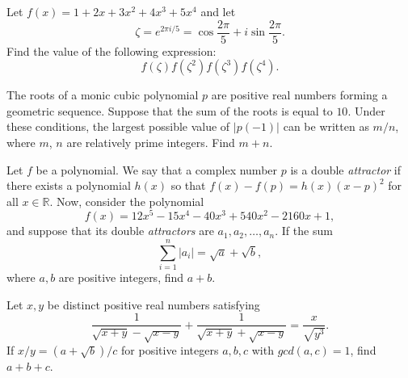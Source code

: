 \documentclass[11pt]{article}
\theoremstyle{definition}
\begin{document}
\begin{question}[name={2021 PUMaC, Algebra, \href{https://artofproblemsolving.com/community/c4p25094239}{Problem A3/B5}}]
	Let $f(x) = 1 + 2x + 3x^2 + 4x^3 + 5x^4$ and let $$\zeta = e^{2\pi i/5} = \cos \frac{2\pi}{5} + i \sin \frac{2\pi}{5}.$$ Find the value of the following expression: $$f(\zeta)f(\zeta^2)f(\zeta^3)f(\zeta^4).$$
\end{question}









\begin{question}[name={2021 PUMaC, Algebra, \href{https://artofproblemsolving.com/community/c4p25094253}{Problem A4/B6}}]
	The roots of a monic cubic polynomial $p$ are positive real numbers forming a geometric sequence. Suppose that the sum of the roots is equal to $10$. Under these conditions, the largest possible value of $|p(-1)|$ can be written as ${m}/{n}$, where $m$, $n$ are relatively prime integers. Find $m + n$.	
\end{question}






\begin{question}[name={2021 PUMaC, Algebra, \href{https://artofproblemsolving.com/community/c4p25094307}{Problem A6/B8}}]
	Let $f$ be a polynomial. We say that a complex number $p$ is a double \textit{attractor} if there exists a polynomial $h(x)$ so that $f(x)-f(p) = h(x)(x-p)^2$ for all $x \in \mathbb R$. Now, consider the polynomial $$f(x) = 12x^5 - 15x^4 - 40x^3 + 540x^2 - 2160x + 1,$$ and suppose that its double \textit{attractors} are $a_1, a_2,\dots, a_n$. If the sum $$\sum^{n}_{i=1}|a_i| = \sqrt{a} +\sqrt{b},$$ where $a, b$ are positive integers, find $a + b$.
\end{question}












\begin{question}[name={2021 PUMaC, Algebra, \href{https://artofproblemsolving.com/community/c4p25094482}{Problem B1}}]
	Let $x, y$ be distinct positive real numbers satisfying
	$$\frac{1}{\sqrt{x + y} -\sqrt{x - y}}+\frac{1}{\sqrt{x + y} +\sqrt{x - y}} =\frac{x}{\sqrt{y^3}}.$$
	If ${x}/{y} =({a+\sqrt{b}})/{c}$ for positive integers $a, b, c$ with $gcd (a, c) = 1$, find $a + b + c$.
\end{question}
\end{document}
